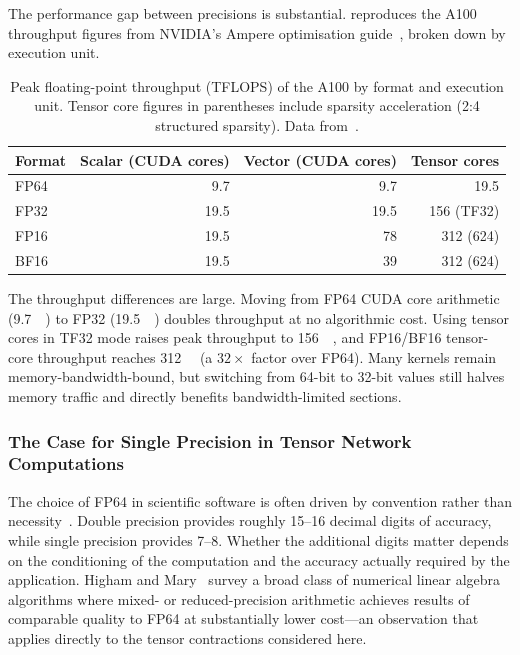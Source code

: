 The performance gap between precisions is substantial.  reproduces the A100 throughput figures from NVIDIA's Ampere optimisation guide~\cite{nvidia2020gtc-ampere}, broken down by execution unit.

\begin{table}[H]
\centering
\caption{Peak floating-point throughput (TFLOPS) of the A100 by format and execution unit. Tensor core figures in parentheses include sparsity acceleration (2:4 structured sparsity). Data from~\cite{nvidia2020gtc-ampere}.}
\label{tab:a100-throughput-by-format}
\begin{tabularx}{\textwidth}{l r r r}
\toprule
Format & Scalar (CUDA cores) & Vector (CUDA cores) & Tensor cores \\
\midrule
FP64   & \num{9.7}  & \num{9.7}  & \num{19.5} \\
FP32   & \num{19.5} & \num{19.5} & \num{156} (TF32) \\
FP16   & \num{19.5} & \num{78}   & \num{312} (\num{624}) \\
BF16   & \num{19.5} & \num{39}   & \num{312} (\num{624}) \\
\bottomrule
\end{tabularx}
\end{table}

The throughput differences are large. Moving from FP64 CUDA core arithmetic
(\SI{9.7}{\tera\flops}) to FP32 (\SI{19.5}{\tera\flops}) doubles throughput at
no algorithmic cost. Using tensor cores in TF32 mode raises peak throughput to
\SI{156}{\tera\flops}, and FP16/BF16 tensor-core throughput reaches
\SI{312}{\tera\flops} (a $32\times$ factor over FP64). Many kernels remain
memory-bandwidth-bound, but switching from 64-bit to 32-bit values still halves
memory traffic and directly benefits bandwidth-limited sections.

\subsubsection{The Case for Single Precision in Tensor Network Computations}\label{sec:fp32-argument}

The choice of FP64 in scientific software is often driven by convention rather than necessity~\cite{higham2022mixed}. Double precision provides roughly 15--16 decimal digits of accuracy, while single precision provides 7--8. Whether the additional digits matter depends on the conditioning of the computation and the accuracy actually required by the application. Higham and Mary~\cite{higham2022mixed} survey a broad class of numerical linear algebra algorithms where mixed- or reduced-precision arithmetic achieves results of comparable quality to FP64 at substantially lower cost---an observation that applies directly to the tensor contractions considered here.

